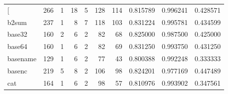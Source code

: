 \begin{longtable}{lrrrrrrrrr}
\bottomrule
\endlastfoot
{[}         &                    266 &                                  1 &                                18 &                                5 &                               128 &                             114 &                                0.815789 &                               0.996241 &                             0.428571 \\
b2sum     &                    237 &                                  1 &                                 8 &                                7 &                               118 &                             103 &                                0.831224 &                               0.995781 &                             0.434599 \\
base32    &                    160 &                                  2 &                                 6 &                                2 &                                82 &                              68 &                                0.825000 &                               0.987500 &                             0.425000 \\
base64    &                    160 &                                  1 &                                 6 &                                2 &                                82 &                              69 &                                0.831250 &                               0.993750 &                             0.431250 \\
basename  &                    129 &                                  1 &                                 6 &                                2 &                                77 &                              43 &                                0.800388 &                               0.992248 &                             0.333333 \\
basenc    &                    219 &                                  5 &                                 8 &                                2 &                               106 &                              98 &                                0.824201 &                               0.977169 &                             0.447489 \\
cat       &                    164 &                                  1 &                                 6 &                                2 &                                98 &                              57 &                                0.810976 &                               0.993902 &                             0.347561 \\

\end{longtable}
